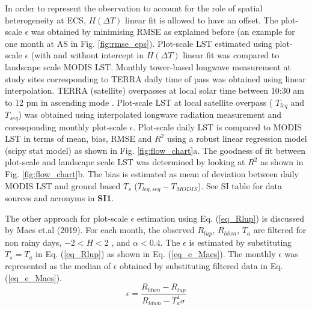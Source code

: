 \documentclass[fleqn,10pt]{wlscirep}
\begin{document}
In order to represent the observation to account for the role of spatial heterogeneity at ECS, $H(\Delta T)$ linear fit is allowed to have an offset. The plot-scale $\epsilon$ was obtained by minimising RMSE as explained before (an example for one month at AS in Fig. \ref{fig:rmse_eps}). Plot-scale LST estimated using plot-scale $\epsilon$ (with and without intercept in $H(\Delta T)$ linear fit was compared to landscape scale MODIS LST. Monthly tower-based longwave measurement at study sites corresponding to TERRA daily time of pass was obtained using linear interpolation. TERRA (satellite) overpasses at local solar time between 10:30 am to 12 pm in ascending mode \cite{guillevic2017land}. Plot-scale LST at local satellite overpass ( $T_{leq}$ and $T_{seq}$) was obtained using interpolated longwave radiation measurement and coressponding monthly plot-scale $\epsilon$. Plot-scale daily LST is compared to MODIS LST in terms of mean, bias, RMSE and $R^2$ using a robust linear regression model (scipy stat model) as shown in Fig. \ref{fig:flow_chart}a. The goodness of fit between plot-scale and landscape scale LST was determined by looking at $R^2$ as shown in Fig. \ref{fig:flow_chart}b. The bias is estimated as mean of deviation between daily MODIS LST and ground based $T_{s}$ ($T_{leq,seq} - T_{MODIS}$). See SI table for data sources and acronyms in \textbf{SI1}.

The other approach for plot-scale $\epsilon$ estimation using Eq. (\ref{eq_Rlup}) is discussed by Maes et.al (2019)\cite{maes2019potential}. For each month, the observed $R_{lup}$,  $R_{ldwn}$, $T_{a}$  are filtered for non rainy days, $-2 < H <2$ , and $\alpha < 0.4$. The $\epsilon$ is estimated by substituting $T_{s} = T_{a}$ in Eq. (\ref{eq_Rlup}) as shown in Eq. (\ref{eq_e_Maes}). The monthly $\epsilon$  was represented as the median of $\epsilon$ obtained by substituting filtered data in Eq. (\ref{eq_e_Maes}). 
\begin{equation}\label{eq_e_Maes}
\epsilon = \frac{R_{ldwn} - R_{lup}}{R_{ldwn} - T_{a}^{4} \sigma}
\end{equation}
\end{document}
